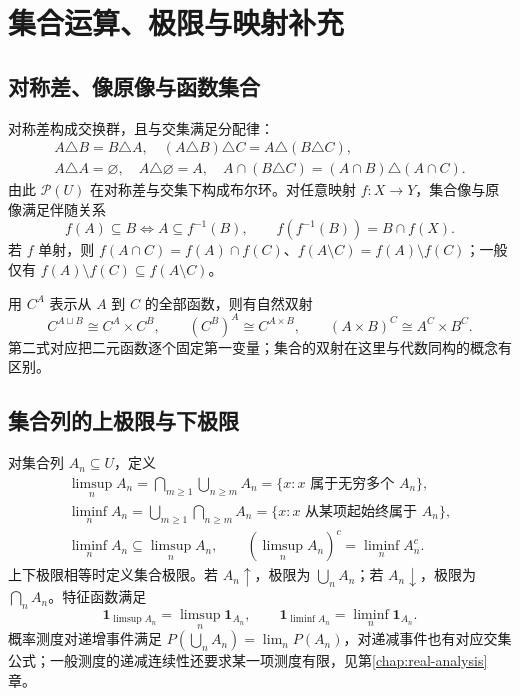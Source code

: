 \documentclass[../main.tex]{subfiles}
\begin{document}
\section{集合运算、极限与映射补充}
\subsection{对称差、像原像与函数集合}
对称差构成交换群，且与交集满足分配律：
\begin{gather*}
A\triangle B=B\triangle A,\quad (A\triangle B)\triangle C=A\triangle(B\triangle C),\\
A\triangle A=\varnothing,\quad A\triangle\varnothing=A,\quad
A\cap(B\triangle C)=(A\cap B)\triangle(A\cap C).
\end{gather*}
由此 $\mathcal P(U)$ 在对称差与交集下构成布尔环。对任意映射 $f:X\to Y$，集合像与原像满足伴随关系
\[
f(A)\subseteq B\iff A\subseteq f^{-1}(B),\qquad
f(f^{-1}(B))=B\cap f(X).
\]
若 $f$ 单射，则 $f(A\cap C)=f(A)\cap f(C)$、$f(A\setminus C)=f(A)\setminus f(C)$；一般仅有 $f(A)\setminus f(C)\subseteq f(A\setminus C)$。

用 $C^A$ 表示从 $A$ 到 $C$ 的全部函数，则有自然双射
\[
C^{A\sqcup B}\cong C^A\times C^B,\qquad
(C^B)^A\cong C^{A\times B},\qquad
(A\times B)^C\cong A^C\times B^C.
\]
第二式对应把二元函数逐个固定第一变量；集合的双射在这里与代数同构的概念有区别。

\subsection{集合列的上极限与下极限}
对集合列 $A_n\subseteq U$，定义
\begin{gather*}
\limsup_nA_n=\bigcap_{m\ge1}\bigcup_{n\ge m}A_n
=\{x:x\text{ 属于无穷多个 }A_n\},\\
\liminf_nA_n=\bigcup_{m\ge1}\bigcap_{n\ge m}A_n
=\{x:x\text{ 从某项起始终属于 }A_n\},\\
\liminf_nA_n\subseteq\limsup_nA_n,\qquad
(\limsup_nA_n)^c=\liminf_n A_n^c.
\end{gather*}
上下极限相等时定义集合极限。若 $A_n\uparrow$，极限为 $\bigcup_nA_n$；若 $A_n\downarrow$，极限为 $\bigcap_nA_n$。特征函数满足
\[
\mathbf1_{\limsup A_n}=\limsup_n\mathbf1_{A_n},\qquad
\mathbf1_{\liminf A_n}=\liminf_n\mathbf1_{A_n}.
\]
概率测度对递增事件满足 $P(\bigcup_nA_n)=\lim_nP(A_n)$，对递减事件也有对应交集公式；一般测度的递减连续性还要求某一项测度有限，见第\ref{chap:real-analysis}章。
\end{document}
